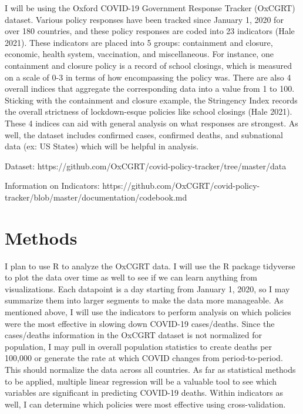 \documentclass[12pt, letterpaper, titlepage]{article}
\begin{document}
I will be using the Oxford COVID-19 Government Response Tracker (OxCGRT) dataset. Various policy responses have been tracked since January 1, 2020 for over 180 countries, and these policy responses are coded into 23 indicators (Hale 2021). These indicators are placed into 5 groups: containment and closure, economic, health system, vaccination, and miscellaneous. For instance, one containment and closure policy is a record of school closings, which is measured on a scale of 0-3 in terms of how encompassing the policy was. There are also 4 overall indices that aggregate the corresponding data into a value from 1 to 100. Sticking with the containment and closure example, the Stringency Index records the overall strictness of lockdown-esque policies like school closings (Hale 2021). These 4 indices can aid with general analysis on what responses are strongest. As well, the dataset includes confirmed cases, confirmed deaths, and subnational data (ex: US States) which will be helpful in analysis.

Dataset:
https://github.com/OxCGRT/covid-policy-tracker/tree/master/data
 
Information on Indicators:
https://github.com/OxCGRT/covid-policy-tracker/blob/master/documentation/codebook.md

\hypertarget{sec:methods}{%
\section{Methods}\label{sec:methods}}

I plan to use R to analyze the OxCGRT data. I will use the R package tidyverse to plot the data over time as well to see if we can learn anything from visualizations. Each datapoint is a day starting from January 1, 2020, so I may summarize them into larger segments to make the data more manageable. As mentioned above, I will use the indicators to perform analysis on which policies were the most effective in slowing down COVID-19 cases/deaths. Since the cases/deaths information in the OxCGRT dataset is not normalized for population, I may pull in overall population statistics to create deaths per 100,000 or generate the rate at which COVID changes from period-to-period. This should normalize the data across all countries. As far as statistical methods to be applied, multiple linear regression will be a valuable tool to see which variables are significant in predicting COVID-19 deaths. Within indicators as well, I can determine which policies were most effective using cross-validation.
\end{document}
